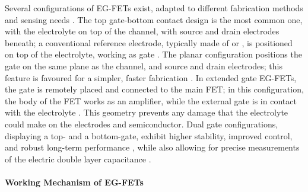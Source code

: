 Several configurations of EG-FETs exist, adapted to different fabrication methods and sensing needs \citep{shkodraElectrolytegated2021}.
The top gate-bottom contact design is the most common one, with the electrolyte on top of the channel, with source and drain electrodes beneath; a conventional reference electrode, typically made of  or , is positioned on top of the electrolyte, working as gate \citep{shkodraElectrolytegated2021}. The planar configuration positions the gate on the same plane as the channel, and source and drain electrodes; this feature is favoured for a simpler, faster fabrication \citep{joshiUnderstanding2018}. In extended gate EG-FETs, the gate is remotely placed and connected to the main FET; in this configuration, the body of the FET works as an amplifier, while the external gate is in contact with the electrolyte \citep{torricelliElectrolytegated2021}. This geometry prevents any damage that the electrolyte could make on the electrodes and semiconductor. Dual gate configurations, displaying a top- and a bottom-gate, exhibit higher stability, improved control, and robust long-term performance \citep{lagoRealtime2022}, while also allowing for precise measurements of the electric double layer capacitance \citep{cramerDouble2012, melzerCharacterization2014}.

\paragraph{Working Mechanism of EG-FETs}
\label{par:mechanismEGFET}

